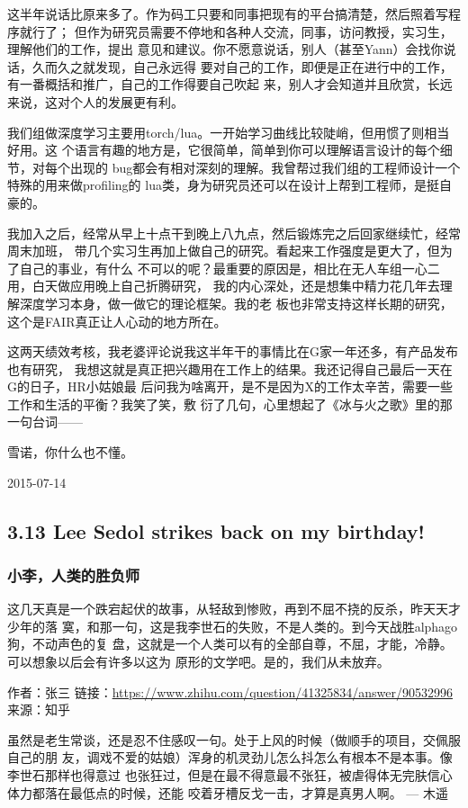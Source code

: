 \documentclass[11pt]{article}
\begin{document}
这半年说话比原来多了。作为码工只要和同事把现有的平台搞清楚，然后照着写程序就行了；
但作为研究员需要不停地和各种人交流，同事，访问教授，实习生，理解他们的工作，提出
意见和建议。你不愿意说话，别人（甚至Yann）会找你说话，久而久之就发现，自己永远得
要对自己的工作，即便是正在进行中的工作，有一番概括和推广，自己的工作得要自己吹起
来，别人才会知道并且欣赏，长远来说，这对个人的发展更有利。

我们组做深度学习主要用torch/lua。一开始学习曲线比较陡峭，但用惯了则相当好用。这
个语言有趣的地方是，它很简单，简单到你可以理解语言设计的每个细节，对每个出现的
bug都会有相对深刻的理解。我曾帮过我们组的工程师设计一个特殊的用来做profiling的
lua类，身为研究员还可以在设计上帮到工程师，是挺自豪的。

我加入之后，经常从早上十点干到晚上八九点，然后锻炼完之后回家继续忙，经常周末加班，
带几个实习生再加上做自己的研究。看起来工作强度是更大了，但为了自己的事业，有什么
不可以的呢？最重要的原因是，相比在无人车组一心二用，白天做应用晚上自己折腾研究，
我的内心深处，还是想集中精力花几年去理解深度学习本身，做一做它的理论框架。我的老
板也非常支持这样长期的研究，这个是FAIR真正让人心动的地方所在。

这两天绩效考核，我老婆评论说我这半年干的事情比在G家一年还多，有产品发布也有研究，
我想这就是真正把兴趣用在工作上的结果。我还记得自己最后一天在G的日子，HR小姑娘最
后问我为啥离开，是不是因为X的工作太辛苦，需要一些工作和生活的平衡？我笑了笑，敷
衍了几句，心里想起了《冰与火之歌》里的那一句台词——

雪诺，你什么也不懂。

2015-07-14
\subsection*{3.13 Lee Sedol strikes back on my birthday!}
\label{sec:orgheadline149}
\subsubsection*{小李，人类的胜负师}
\label{sec:orgheadline146}
这几天真是一个跌宕起伏的故事，从轻敌到惨败，再到不屈不挠的反杀，昨天天才少年的落
寞，和那一句，这是我李世石的失败，不是人类的。到今天战胜alphago狗，不动声色的复
盘，这就是一个人类可以有的全部自尊，不屈，才能，冷静。可以想象以后会有许多以这为
原形的文学吧。是的，我们从未放弃。

作者：张三
链接：\url{https://www.zhihu.com/question/41325834/answer/90532996}
来源：知乎


虽然是老生常谈，还是忍不住感叹一句。处于上风的时候（做顺手的项目，交佩服自己的朋
友，调戏不爱的姑娘）浑身的机灵劲儿怎么抖怎么有根本不是本事。像李世石那样也得意过
也张狂过，但是在最不得意最不张狂，被虐得体无完肤信心体力都落在最低点的时候，还能
咬着牙槽反戈一击，才算是真男人啊。 --- 木遥
\end{document}
